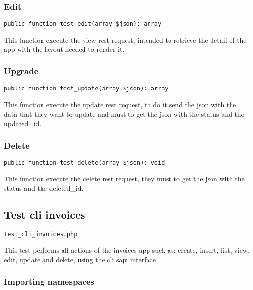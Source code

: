 \documentclass[a4paper]{article}
\begin{document}
\hypertarget{toc60}{}
\subsubsection{Edit}

\begin{lstlisting}
public function test_edit(array $json): array
\end{lstlisting}

This function execute the view rest request, intended to retrieve the detail
of the app with the layout needed to render it.

\hypertarget{toc61}{}
\subsubsection{Upgrade}

\begin{lstlisting}
public function test_update(array $json): array
\end{lstlisting}

This function execute the update rest request, to do it send the json with
the data that they want to update and must to get the json with the status
and the updated\_id.

\hypertarget{toc62}{}
\subsubsection{Delete}

\begin{lstlisting}
public function test_delete(array $json): void
\end{lstlisting}

This function execute the delete rest request, they must to get the json
with the status and the deleted\_id.

\hypertarget{toc63}{}
\subsection{Test cli invoices}

\begin{lstlisting}
test_cli_invoices.php
\end{lstlisting}

This test performs all actions of the invoices app suck as: create, insert,
list, view, edit, update and delete, using the cli sapi interface

\hypertarget{toc64}{}
\subsubsection{Importing namespaces}
\end{document}
